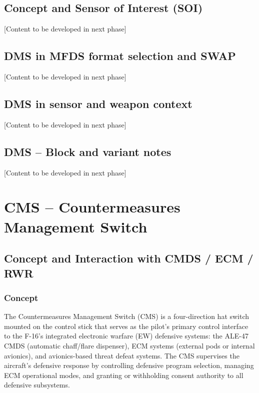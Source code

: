 \documentclass[11pt,a4paper]{article}
\begin{document}
\subsection{Concept and Sensor of Interest (SOI)}

[Content to be developed in next phase]

\subsection{DMS in MFDS format selection and SWAP}

[Content to be developed in next phase]

\subsection{DMS in sensor and weapon context}

[Content to be developed in next phase]

\subsection{DMS -- Block and variant notes}

[Content to be developed in next phase]

\section{CMS -- Countermeasures Management Switch}\label{sec:C5}

\subsection{Concept and Interaction with CMDS / ECM / RWR}\label{sec:C5-S1}

\subsubsection{Concept}\label{sec:C5-S1-S1}

The Countermeasures Management Switch (CMS) is a four-direction hat switch mounted on the control stick that serves as the pilot's primary control interface to the F-16's integrated electronic warfare (EW) defensive systems: the ALE-47 CMDS (automatic chaff/flare dispenser), ECM systems (external pods or internal avionics), and avionics-based threat defeat systems. The CMS supervises the aircraft's defensive response by controlling defensive program selection, managing ECM operational modes, and granting or withholding consent authority to all defensive subsystems.
\end{document}
